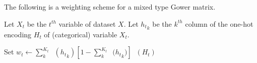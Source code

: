 \documentclass[8pt]{article}
\DeclareMathOperator{\Var}{\widehat{Var}}
\DeclareMathOperator{\Kurt}{\widehat{Kurt}}
\begin{document}
    The following is a weighting scheme for a mixed type Gower matrix.

    Let $X_t$ be the $t^{th}$ variable of dataset $X$.
    Let ${h_t}_k$ be the $k^{th}$ column of the one-hot encoding $H_t$ of (categorical) variable $X_t$.

    Set $w_t\leftarrow\sum_k^{K_t}{\Var({h_t}_k)}\left[1-\sum_k^{K_t}{\Var({h_t}_k})\right]\Kurt(H_t)$
\end{document}
